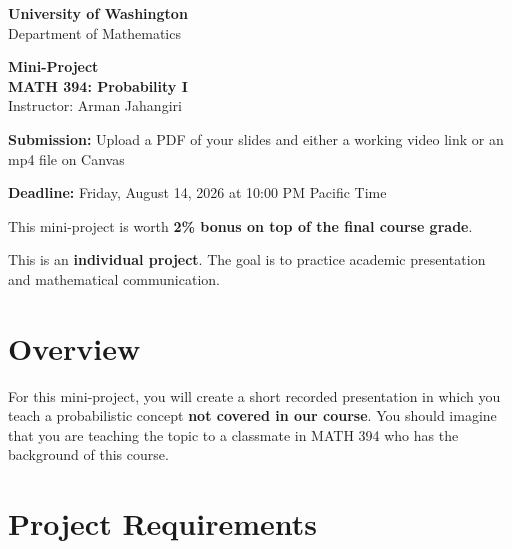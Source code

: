 \documentclass[11pt]{article}
\newcommand{\course}{MATH 394: Probability I}
\newcommand{\department}{Department of Mathematics}
\newcommand{\university}{University of Washington}
\begin{document}
\begin{titlepage}
\centering
\vspace*{1.2cm}

{\Large \textbf{\university}}\\
{\large \department}

\vspace{1.5cm}

{\Huge \color{uwpurple}\textbf{Mini-Project}}\\[0.25cm]
{\Large \textbf{\course}}\\[0.25cm]
{\large Instructor: Arman Jahangiri}

\vspace{1cm}

\begin{tcolorbox}[
    width=0.8\textwidth,
    colback=softpurple,
    colframe=uwpurple,
    boxrule=0.9pt,
    arc=3mm
]
\centering
\textbf{Submission:} Upload a PDF of your slides and either a working video link or an mp4 file on Canvas

\textbf{Deadline:} Friday, August 14, 2026 at 10:00 PM Pacific Time
\end{tcolorbox}

\vspace{0.8cm}

\begin{tcolorbox}[
    width=0.86\textwidth,
    colback=white,
    colframe=uwgold,
    boxrule=0.8pt,
    arc=3mm
]
This mini-project is worth \textbf{2\% bonus on top of the final course grade}.

This is an \textbf{individual project}. The goal is to practice academic presentation and mathematical communication.
\end{tcolorbox}

\vfill
\end{titlepage}

\section*{Overview}

For this mini-project, you will create a short recorded presentation in which you teach a probabilistic concept \textbf{not covered in our course}. You should imagine that you are teaching the topic to a classmate in MATH 394 who has the background of this course.


\section*{Project Requirements}
\end{document}
